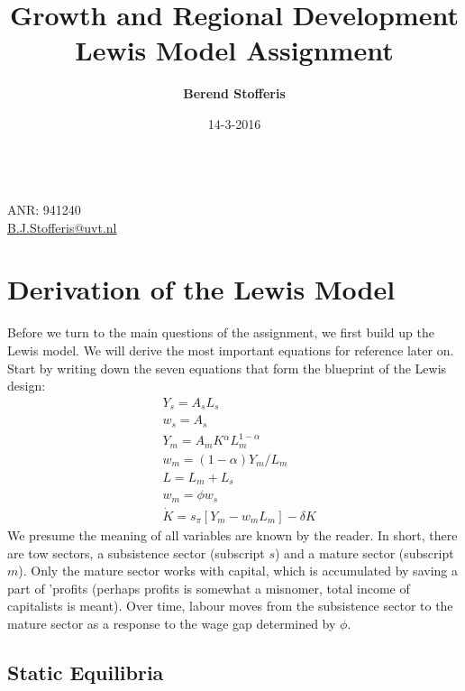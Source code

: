 \documentclass[a4paper]{article}
\title{\textbf{Growth and Regional Development}\\ Lewis Model Assignment}
\begin{document}
\date{14-3-2016}
\author{}
\maketitle
\begin{center}
\author{\bf Berend Stofferis}\\
ANR: 941240\\
\href{mailto: B.J.Stofferis@uvt.nl}{B.J.Stofferis@uvt.nl}\\
\end{center}
\thispagestyle{empty}

\newpage
\tableofcontents
\newpage
\section{Derivation of the Lewis Model}
Before we turn to the main questions of the assignment, we first build up the Lewis model. We will derive the most important equations for reference later on. Start by writing down the seven equations that form the blueprint of the Lewis design:
\begin{align}
	& Y_s=A_sL_s\\
	& w_s=A_s\\
    & Y_m=A_mK{^\alpha}L_m^{1-\alpha}\\
    & w_m=(1-\alpha)Y_m/L_m\\
    & L=L_m+L_s\\
    & w_m={\phi}w_s\\
    & \dot{K}=s_{\pi}[Y_m-w_mL_m]-{\delta}K
\end{align}
We presume the meaning of all variables are known by the reader. In short, there are tow sectors, a subsistence sector (subscript $s$) and a mature sector (subscript $m$). Only the mature sector works with capital, which is accumulated by saving a part of 'profits (perhaps profits is somewhat a misnomer, total income of capitalists is meant). Over time, labour moves from the subsistence sector to the mature sector as a response to the wage gap determined by ${\phi}$.

\subsection{Static Equilibria}
\end{document}
